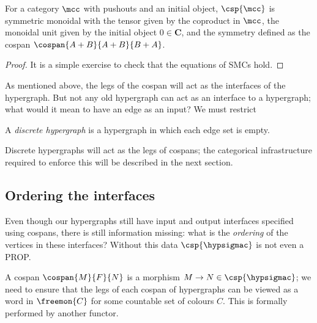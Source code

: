 \begin{lemma}
    For a category \(\mcc\) with pushouts and an initial object,
    \(\csp{\mcc}\) is symmetric monoidal with the tensor given by the
    coproduct in \(\mcc\), the monoidal unit given by the initial object
    \(0 \in \mathbf{C}\), and the symmetry defined as the cospan
    \(\cospan{A+B}{A+B}{B+A}\).
\end{lemma}
\begin{proof}
    It is a simple exercise to check that the equations of SMCs hold.
\end{proof}



As mentioned above, the legs of the cospan will act as the interfaces of the
hypergraph.
But not any old hypergraph can act as an interface to a hypergraph; what would
it mean to have an edge as an input?
We must restrict

\begin{definition}
    A \emph{discrete hypergraph} is a hypergraph in which each edge set is
    empty.
\end{definition}

Discrete hypergraphs will act as the legs of cospans; the categorical
infrastructure required to enforce this will be described in the next section.

\subsection{Ordering the interfaces}

Even though our hypergraphs still have input and output interfaces specified
using cospans, there is still information missing: what is the \emph{ordering}
of the vertices in these interfaces?
Without this data \(\csp{\hypsigmac}\) is not even a PROP.

A cospan \(\cospan{M}{F}{N}\) is a morphism
\(M \to N \in \csp{\hypsigmac}\); we need to ensure that the legs of each
cospan of hypergraphs can be viewed as a word in \(\freemon{C}\) for some
countable set of colours \(C\).
This is formally performed by another functor.

